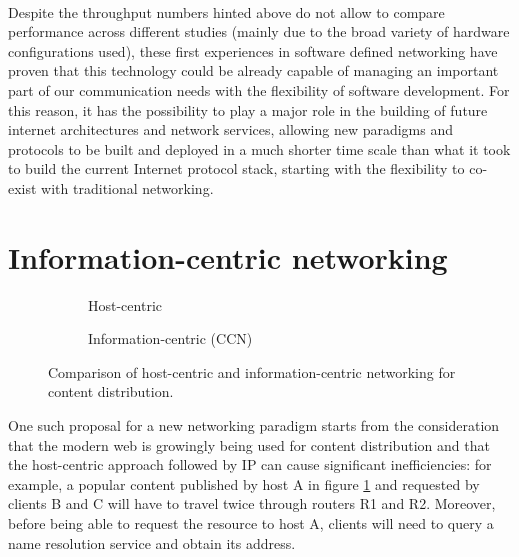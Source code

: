 \documentclass[11pt,a4paper,twoside,titlepage,openany]{book}
\begin{document}
\paragraph{} Despite the throughput numbers hinted above do not allow to compare performance across different studies (mainly due to the broad variety of hardware configurations used), these first experiences in software defined networking have proven that this technology could be already capable of managing an important part of our communication needs with the flexibility of software development. For this reason, it has the possibility to play a major role in the building of future internet architectures and network services, allowing new paradigms and protocols to be built and deployed in a much shorter time scale than what it took to build the current Internet protocol stack, starting with the flexibility to co-exist with traditional networking.

\section{Information-centric networking}\label{sec:intro.icn}
\begin{figure}[tb]
  \centering
  \begin{subfigure}{.5\textwidth}
    \centering
    
    \caption{Host-centric}
    \label{fig:intro.icn.a}
  \end{subfigure}%
  \begin{subfigure}{.5\textwidth}
    \centering
    
    \caption{Information-centric (CCN)}
    \label{fig:intro.icn.b}
  \end{subfigure}
  \caption[Comparison of host-centric and information-centric networking for content distribution]{Comparison of host-centric and information-centric networking for content distribution.}
  \label{fig:intro.icn}
\end{figure}

One such proposal for a new networking paradigm starts from the consideration that the modern web is growingly being used for content distribution and that the host-centric approach followed by IP can cause significant inefficiencies: for example, a popular content published by host A in figure \ref{fig:intro.icn.a}
and requested by clients B and C will have to travel twice through routers R1 and R2. Moreover, before being able to request the resource to host A, clients will need to query a name resolution service and obtain its address.
\end{document}
